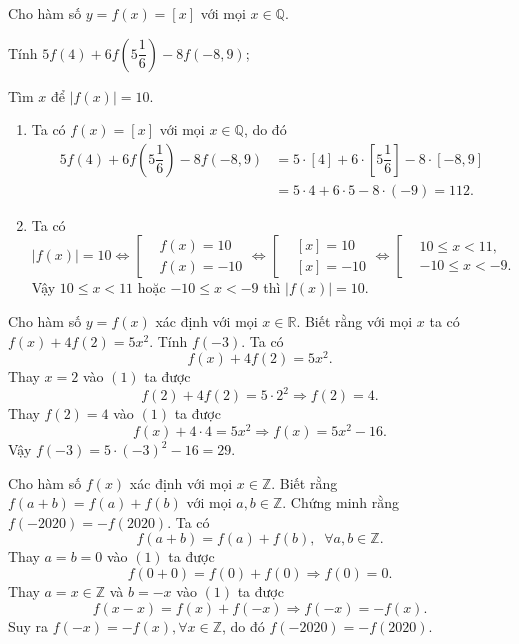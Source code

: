 \begin{vd}
Cho hàm số $y=f(x)=[x]$ với mọi $x\in\mathbb{Q}$.
\begin{listEX}[2]
	\item Tính $5f(4)+6f\left(5\dfrac{1}{6}\right)-8f(-8,9)$;
	\item Tìm $x$ để $|f(x)|=10$.
\end{listEX}
\loigiai
{
\begin{enumerate}
\item Ta có $f(x)=[x]$ với mọi $x\in\mathbb{Q}$, do đó
\begin{align*}
5f(4)+6f\left(5\dfrac{1}{6}\right)-8f(-8,9)&=5\cdot [4]+6\cdot\left[5\dfrac{1}{6}\right]-8\cdot [-8,9]\\ 
&=5\cdot 4+6\cdot 5-8\cdot (-9)=112.
\end{align*}
\item Ta có
\[|f(x)|=10 \Leftrightarrow \left[\begin{aligned}& f(x)=10\\&f(x)=-10\end{aligned}\right.\Leftrightarrow \left[\begin{aligned}& [x]=10\\&[x]=-10\end{aligned}\right.\Leftrightarrow \left[\begin{aligned}&10\le x<11,\\&-10\le x<-9.\end{aligned}\right.\]
Vậy $10\le x<11$ hoặc $-10\le x<-9$ thì $|f(x)|=10$.
\end{enumerate}
}
\end{vd}
\begin{vd}
Cho hàm số $y=f(x)$ xác định với mọi $x\in\mathbb{R}$. Biết rằng với mọi $x$ ta có $f(x)+4f(2)=5x^2$. Tính $f(-3)$.
\loigiai
{
Ta có \[f(x)+4f(2)=5x^2.\tag{1}\]
Thay $x=2$ vào $(1)$ ta được 
\[f(2)+4f(2)=5\cdot 2^2\Rightarrow f(2)=4.\]
Thay $f(2)=4$ vào $(1)$ ta được 
\[f(x)+4\cdot 4=5x^2\Rightarrow f(x)=5x^2-16.\]
Vậy $f(-3)=5\cdot (-3)^2-16=29$.
}
\end{vd}
\begin{vd}
Cho hàm số $f(x)$ xác định với  mọi $x\in\mathbb{Z}$. Biết rằng $f(a+b)=f(a)+f(b)$ với mọi $a,b\in\mathbb{Z}$. Chứng minh rằng $f(-2020)=-f(2020)$.
\loigiai
{
Ta có \[f(a+b)=f(a)+f(b),\;\;\forall a,b\in\mathbb{Z}.\tag{1}\]
Thay $a=b=0$ vào $(1)$ ta được 
\[f(0+0)=f(0)+f(0)\Rightarrow f(0)=0.\]
Thay $a=x\in \mathbb{Z}$ và $b=-x$ vào $(1)$ ta được 
\[f(x-x)=f(x)+f(-x)\Rightarrow f(-x)=-f(x).\]
Suy ra $f(-x)=-f(x), \forall x\in\mathbb{Z}$, do đó $f(-2020)=-f(2020)$.
}
\end{vd}

